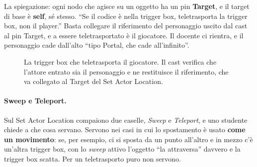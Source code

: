 La spiegazione: ogni nodo che agisce su un oggetto ha un pin
\textbf{Target}, e il target di base è \textbf{self}, sé stesso. ``Se il codice
è nella trigger box, teletrasporta la trigger box, non il player.'' Basta
collegare il riferimento del personaggio uscito dal cast al pin Target, e a
essere teletrasportato è il giocatore. Il docente ci rientra, e il personaggio
cade dall'alto ``tipo Portal, che cade all'infinito''.

\begin{figure}[htbp]
\centering
{}
\caption{La trigger box che teletrasporta il giocatore. Il cast verifica che
l'attore entrato sia il personaggio e ne restituisce il riferimento, che va
collegato al Target del Set Actor Location.}
\label{gd7:fig:trigger}
\end{figure}

\paragraph{Sweep e Teleport.} Sul Set Actor Location compaiono due caselle,
\emph{Sweep} e \emph{Teleport}, e uno studente chiede a che cosa servano.
Servono nei casi in cui lo spostamento è usato \textbf{come un movimento}: se,
per esempio, ci si sposta da un punto all'altro e in mezzo c'è un'altra
trigger box, con lo \emph{sweep} attivo l'oggetto ``la attraversa'' davvero e
la trigger box scatta. Per un teletrasporto puro non servono.


